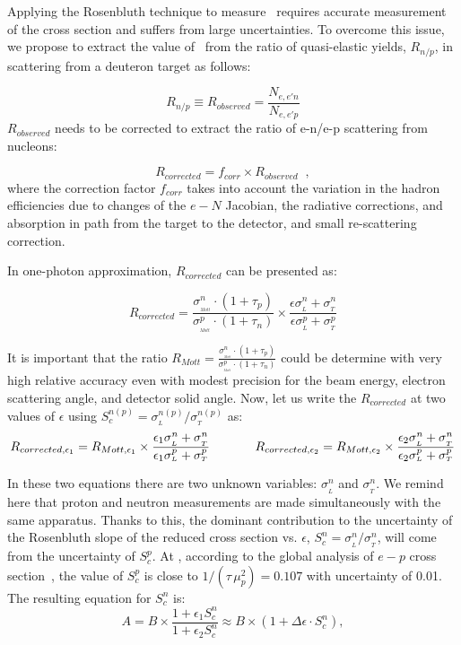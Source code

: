 Applying the Rosenbluth technique to measure \gen~requires accurate measurement of the cross section  and suffers from large uncertainties. 
To overcome this issue, we propose to extract the value of \gen~from the ratio of quasi-elastic yields, $R_{n/p}$, in scattering from a deuteron target as follows: 

\begin{equation}
R_{n/p} \equiv R_{observed} = \frac{N_{e,e'n}}{N_{e,e'p}}
\label{eq:1}
\end{equation}
$R_{observed}$ needs to be corrected to extract the ratio of e-n/e-p scattering from nucleons:

\begin{equation}
R_{corrected} = f_{corr} \times R_{observed} \;\; ,
\label{eq:2}
\end{equation}
where the correction factor $f_{corr}$ takes into account the variation in the hadron efficiencies due to changes of the $e-N$ Jacobian, the radiative corrections, and absorption in path
from the target to the detector, and small re-scattering correction.

In one-photon approximation, $R_{corrected}$ can be presented as: 

\begin{equation}
R_{corrected} = \frac {\sigma_{_{_{Mott}}}^n \cdot (1+\tau_p)}{\sigma_{_{_{Mott}}}^p \cdot (1+\tau_n)} \times \frac{\epsilon \sigma_{_L}^n + \sigma_{_T}^n}{\epsilon \sigma_{_L}^p + \sigma_{_T}^p}
\end{equation}

It is important that the ratio $R_{Mott} = \frac {\sigma_{_{_{Mott}}}^n \cdot (1+\tau_p)}{\sigma_{_{_{Mott}}}^p \cdot (1+\tau_n)}$ could be determine with very high relative accuracy even with modest precision for the beam energy, electron scattering angle, and detector solid angle. 
Now, let us write the $R_{corrected}$ at two values of $\epsilon$ using $S_c^{n(p)} = \sigma_{_L}^{n(p)}/ \sigma_{_T}^{n(p)}$ as:
\begin{equation*}
R_{{corrected},\epsilon_1} = R_{Mott,\epsilon_1} \times \frac{\epsilon_1 \sigma_{_L}^n + \sigma_{_T}^n}{\epsilon_1 \sigma_{_L}^p + \sigma_{_T}^p}
\hskip .5 in
R_{{corrected},\epsilon_2} = R_{Mott,\epsilon_2} \times \frac{\epsilon_2 \sigma_{_L}^n + \sigma_{_T}^n}{\epsilon_2 \sigma_{_L}^p + \sigma_{_T}^p}
\end{equation*}

In these two equations there are two unknown variables: $\sigma_{_L}^n$ and $\sigma_{_T}^n$.
We remind here that proton and neutron measurements are made simultaneously with the same apparatus. 
Thanks to this, the dominant contribution to the uncertainty of the Rosenbluth slope of the reduced cross section vs. $\epsilon$,  
$S_c^n = \sigma_{_L}^n/ \sigma_{_T}^n$, will come from the uncertainty of $S_c^p$.
At  \gevcsq, according to the global analysis of $e-p$ cross section~\cite{Christy2020ab}, the value of $S_c^p$ is close to $1/(\tau \, \mu_p^2) = 0.107$ with uncertainty of 0.01.
The resulting equation for $S_c^n$ is:
\begin{equation*}
A = B \times \frac{1 + \epsilon_1 S_c^n}{1 + \epsilon_2 S_c^n} \approx B \times (1 +  \Delta \epsilon \cdot S_c^n),
\end{equation*}

